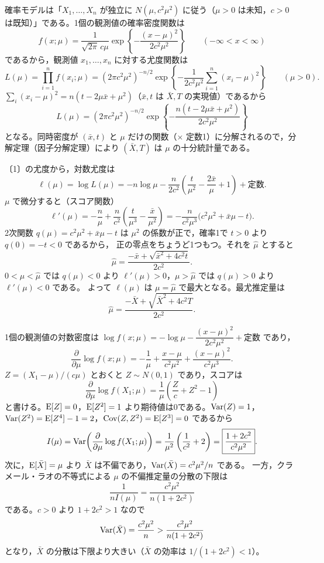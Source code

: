 \documentclass[a4paper,11pt]{ltjsarticle}
\begin{document}
確率モデルは「$X_1,\ldots,X_n$ が独立に $N(\mu,c^2\mu^2)$ に従う（$\mu>0$ は未知，$c>0$ は既知）」である。1個の観測値の確率密度関数は
\[
f(x;\mu)=\frac{1}{\sqrt{2\pi}\,c\mu}\exp\!\left\{-\frac{(x-\mu)^2}{2c^2\mu^2}\right\}\qquad(-\infty<x<\infty)
\]
であるから，観測値 $x_1,\ldots,x_n$ に対する尤度関数は
\[
L(\mu)=\prod_{i=1}^nf(x_i;\mu)=(2\pi c^2\mu^2)^{-n/2}\exp\!\left\{-\frac{1}{2c^2\mu^2}\sum_{i=1}^n(x_i-\mu)^2\right\}\qquad(\mu>0).
\]
$\sum_i(x_i-\mu)^2=n(t-2\mu\bar x+\mu^2)$（$\bar x,t$ は $\bar X,T$ の実現値）であるから
\[
\boxed{L(\mu)=(2\pi c^2\mu^2)^{-n/2}\exp\!\left\{-\frac{n(t-2\mu\bar x+\mu^2)}{2c^2\mu^2}\right\}}
\]
となる。同時密度が $(\bar x,t)$ と $\mu$ だけの関数（$\times$ 定数1）に分解されるので，分解定理（因子分解定理）により $(\bar X,T)$ は $\mu$ の十分統計量である。

〔1〕の尤度から，対数尤度は
\[
\ell(\mu)=\log L(\mu)=-n\log\mu-\frac{n}{2c^2}\left(\frac{t}{\mu^2}-\frac{2\bar x}{\mu}+1\right)+\text{定数}.
\]
$\mu$ で微分すると（スコア関数）
\[
\ell'(\mu)=-\frac n\mu+\frac{n}{c^2}\left(\frac{t}{\mu^3}-\frac{\bar x}{\mu^2}\right)
=-\frac{n}{c^2\mu^3}\bigl(c^2\mu^2+\bar x\mu-t\bigr).
\]
2次関数 $q(\mu)=c^2\mu^2+\bar x\mu-t$ は $\mu^2$ の係数が正で，確率1で $t>0$ より $q(0)=-t<0$ であるから，
正の零点をちょうど1つもつ。それを $\hat\mu$ とすると
\[
\hat\mu=\frac{-\bar x+\sqrt{\bar x^2+4c^2t}}{2c^2}.
\]
$0<\mu<\hat\mu$ では $q(\mu)<0$ より $\ell'(\mu)>0$，$\mu>\hat\mu$ では $q(\mu)>0$ より $\ell'(\mu)<0$ である。
よって $\ell(\mu)$ は $\mu=\hat\mu$ で最大となる。最尤推定量は
\[
\boxed{\hat\mu=\frac{-\bar X+\sqrt{\bar X^2+4c^2T}}{2c^2}}.
\]

1個の観測値の対数密度は $\log f(x;\mu)=-\log\mu-\dfrac{(x-\mu)^2}{2c^2\mu^2}+\text{定数}$ であり，
\[
\frac{\partial}{\partial\mu}\log f(x;\mu)=-\frac1\mu+\frac{x-\mu}{c^2\mu^2}+\frac{(x-\mu)^2}{c^2\mu^3}.
\]
$Z=(X_1-\mu)/(c\mu)$ とおくと $Z\sim N(0,1)$ であり，スコアは
\[
\frac{\partial}{\partial\mu}\log f(X_1;\mu)=\frac1\mu\left(\frac Zc+Z^2-1\right)
\]
と書ける。$\operatorname{E}[Z]=0$，$\operatorname{E}[Z^2]=1$ より期待値は0である。$\operatorname{Var}(Z)=1$，$\operatorname{Var}(Z^2)=\operatorname{E}[Z^4]-1=2$，$\operatorname{Cov}(Z,Z^2)=\operatorname{E}[Z^3]=0$ であるから
\[
I(\mu)=\operatorname{Var}\!\left(\frac{\partial}{\partial\mu}\log f(X_1;\mu)\right)
=\frac{1}{\mu^2}\left(\frac{1}{c^2}+2\right)=\boxed{\frac{1+2c^2}{c^2\mu^2}}.
\]
次に，$\operatorname{E}[\bar X]=\mu$ より $\bar X$ は不偏であり，$\operatorname{Var}(\bar X)=c^2\mu^2/n$ である。
一方，クラメール・ラオの不等式による $\mu$ の不偏推定量の分散の下限は
\[
\frac{1}{nI(\mu)}=\frac{c^2\mu^2}{n(1+2c^2)}
\]
である。$c>0$ より $1+2c^2>1$ なので
\[
\operatorname{Var}(\bar X)=\frac{c^2\mu^2}{n}>\frac{c^2\mu^2}{n(1+2c^2)}
\]
となり，$\bar X$ の分散は下限より大きい（$\bar X$ の効率は $1/(1+2c^2)<1$）。
\end{document}
